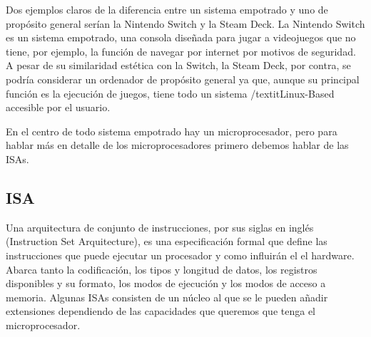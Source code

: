 Dos ejemplos claros de la diferencia entre un sistema empotrado y uno de propósito general serían la Nintendo Switch y la Steam Deck. La Nintendo Switch es un sistema empotrado, una consola diseñada para jugar a videojuegos que no tiene, por ejemplo, la función de navegar por internet por motivos de seguridad. 
A pesar de su similaridad estética con la Switch, la Steam Deck, por contra, se podría considerar un ordenador de propósito general ya que, aunque su principal función es la ejecución de juegos, tiene todo un sistema /textit{Linux-Based} accesible por el usuario.



%
%
%
%
%


En el centro de todo sistema empotrado hay un microprocesador, pero para hablar más en detalle de los microprocesadores primero debemos hablar de las ISAs.

\subsection{ISA}
Una arquitectura de conjunto de instrucciones,  por sus siglas en inglés (Instruction Set Arquitecture), es una especificación formal que define las instrucciones que puede ejecutar un procesador y como influirán el el hardware. Abarca tanto la codificación, los tipos y longitud de datos, los registros disponibles y su formato, los modos de ejecución y los modos de acceso a memoria. Algunas ISAs consisten de un núcleo al que se le pueden añadir extensiones dependiendo de las capacidades que queremos que tenga el microprocesador.\\


